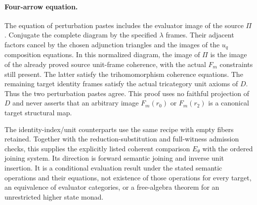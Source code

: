 \documentclass{article}
\begin{document}
\paragraph{Four-arrow equation.} The equation of perturbation pastes includes the evaluator image of the source $\Pi$. Conjugate the complete diagram by the specified $\lambda$ frames. Their adjacent factors cancel by the chosen adjunction triangles and the images of the $u_q$ composition equations. In this normalized diagram, the image of $\Pi$ is the image of the already proved source unit-frame coherence, with the actual $F_m$ constraints still present. The latter satisfy the trihomomorphism coherence equations. The remaining target identity frames satisfy the actual tricategory unit axioms of $D$. Thus the two perturbation pastes agree. This proof uses no faithful projection of $D$ and never asserts that an arbitrary image $F_m(r_0)$ or $F_m(r_2)$ is a canonical target structural map.

The identity-index/unit counterparts use the same recipe with empty fibers retained. Together with the reduction-substitution and full-witness admission checks, this supplies the explicitly listed coherent comparison $E_\theta$ with the ordered joining system. Its direction is forward semantic joining and inverse unit insertion. It is a conditional evaluation result under the stated semantic operations and their equations, not existence of those operations for every target, an equivalence of evaluator categories, or a free-algebra theorem for an unrestricted higher state monad.
\end{document}
